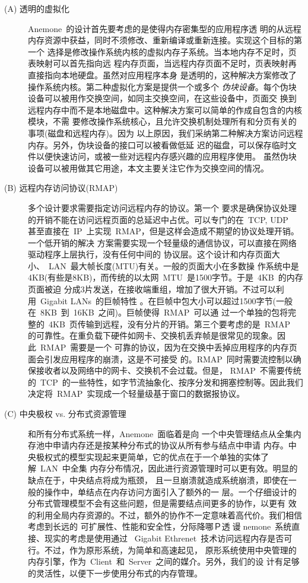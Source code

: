 \documentclass[dvipdfm, NoBUAAtitle]{BUAApaper}
\begin{document}
\begin{description}

\item [(A) 透明的虚拟化] Anemone~的设计首先要考虑的是使得内存密集型的应用程序透
明的从远程内存资源中获益，同时不须修改、重新编译或重新连接。实现这个目标的第一个
选择是修改操作系统内核的虚拟内存子系统。当本地内存不足时，页表映射可以首先指向远
程内存页面，当远程内存页面不足时，页表映射再直接指向本地硬盘。虽然对应用程序本身
是透明的，这种解决方案修改了操作系统内核。第二种虚拟化方案是提供一个或多个{\em 
伪块设备}。每个伪块设备可以被用作交换空间，如同主交换空间，在这些设备中，页面交
换到远程内存中而不是本地磁盘中。这种解决方案可以简单的作成自包含的内核模块，不需
要修改操作系统核心，且允许交换机制处理所有和分页有关的事项(磁盘和远程内存)。因为
以上原因，我们采纳第二种解决方案访问远程内存。另外，伪块设备的接口可以被看做低延
迟的磁盘，可以保存临时文件以便快速访问，或被一些对远程内存感兴趣的应用程序使用。
虽然伪块设备可以被用做其它用途，本文主要关注它作为交换空间的情况。

\item[(B) 远程内存访问协议(RMAP)] 多个设计要求需要指定访问远程内存的协议。第一个
要求是确保协议处理的开销不能在访问远程页面的总延迟中占优。可以专门的在~TCP, UDP~
甚至直接在~IP~上实现~RMAP，但是这样会造成不期望的协议处理开销。一个低开销的解决
方案需要实现一个轻量级的通信协议，可以直接在网络驱动程序上层执行，没有任何中间的
协议层。这个设计和内存页面大小、~LAN~最大帧长度(MTU)有关。一般的页面大小在多数操
作系统中是4KB(有些是8KB)，而传统的以太网~MTU~是1500字节。于是~4KB~的内存页面被迫
分成3片发送，在接收端重组，增加了很大开销。不过可以利用~Gigabit LANs~的巨帧特性
。在巨帧中包大小可以超过1500字节(一般在~8KB~到~16KB~之间)。巨帧使得~RMAP~可以通
过一个单独的包将完整的~4KB~页传输到远程，没有分片的开销。第三个要考虑的是~RMAP~
的可靠性。在重负载下硬件如网卡、交换机丢弃帧是很常见的现象。因此~RMAP~需要是一个
可靠的协议，因为在交换中丢掉应用程序的内存页面会引发应用程序的崩溃，这是不可接受
的。RMAP~同时需要流控制以确保接收者以及网络中的网卡、交换机不会过载。但是，
RMAP~不需要传统的~TCP~的一些特性，如字节流抽象化、按序分发和拥塞控制等。因此我们
决定将~RMAP~实现成一个轻量级基于窗口的数据报协议。

\item[(C) 中央极权 vs. 分布式资源管理] 和所有分布式系统一样，Anemone~面临着是向
一个中央管理结点从全集内存池中申请内存还是按某种分布式的协议从所有参与结点中申请
内存。中央极权式的模型实现起来更简单，它的优点在于一个单独的实体了解~LAN~中全集
内存分布情况，因此进行资源管理时可以更有效。明显的缺点在于，中央结点将成为瓶颈，
且一旦崩溃就造成系统崩溃，即使在一般的操作中，单结点在内存访问方面引入了额外的一
层。一个仔细设计的分布式管理模型不会有这些问题，但是需要结点间更多的协作，以更有
效的利用全局内存资源的。不过，额外的协作不一定意味着高代价。我们相信考虑到长远的
可扩展性、性能和安全性，分际降哪Ｐ透谩nemone~系统直接、现实的考虑是使用通过
~Gigabit Ethrenet~技术访问远程内存是否可行。不过，作为原形系统，为简单和高速起见，
原形系统使用中央管理的内存引擎，作为~Client~和~Server~之间的媒介。另外，我们的设
计有足够的灵活性，以便下一步使用分布式的内存管理。


\end{description}
\end{document}
